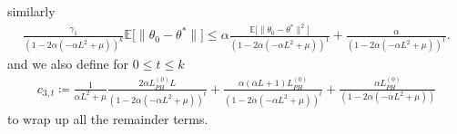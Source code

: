 \documentclass[a4paper]{article}
\newcommand{\norm}[1]{\|#1 \|}
\newcommand{\Exs}{\mathbb{E}}
\newcommand{\thetastar}{\theta^*}
\newcommand{\constLPH}[1]{L_{PH}^{(#1)}}
\newcommand{\stepsize}{\alpha}
\begin{document}
	similarly
	\begin{align*}
		\frac{\gamma_1}{(1 - 2 \stepsize (-\stepsize L^2 + \mu))^k} \Exs \big[ \norm{\theta_0 - \thetastar} \big] \leq \stepsize \frac{\Exs \big[ \norm{\theta_0 - \thetastar}^2 \big]}{(1 - 2 \stepsize (-\stepsize L^2 + \mu))^1} + \frac{\stepsize}{(1 - 2 \stepsize (-\stepsize L^2 + \mu))^1}.
	\end{align*}
	and we also define for $0 \le t \le k$
	\begin{align*}
		c_{3, t} \coloneq \frac{1}{\stepsize L^{2} + \mu}\frac{2\stepsize\constLPH{0}L}{\left(1 - 2\stepsize\left(-\stepsize L^{2} + \mu\right)\right)^{t}} + \frac{\stepsize\left(\stepsize L + 1\right)\constLPH{0}}{\left(1 - 2\stepsize\left(-\stepsize L^{2} + \mu\right)\right)^{t}} + \frac{\stepsize\constLPH{0}}{\left(1 - 2\stepsize\left(-\stepsize L^{2} + \mu\right)\right)}
	\end{align*}
	to wrap up all the remainder terms.
	
\end{document}
